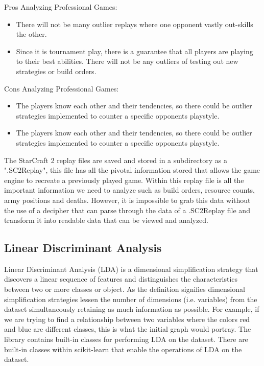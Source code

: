 \documentclass[a4paper,12pt]{report}
\begin{document}
Pros Analyzing Professional Games:
\vspace*{-.8cm}
\begin{itemize}[,]
    \setlength\itemsep{-.1cm}
    \item There will not be many outlier replays where one opponent vastly out-skills the other.
    \item Since it is tournament play, there is a guarantee that all players are playing to their best abilities. There will not be any outliers of testing out new strategies or build orders.
\end{itemize}

Cons Analyzing Professional Games:
\vspace*{-.775cm}
\begin{itemize}[,]
    \setlength\itemsep{-.1cm}
    \item The players know each other and their tendencies, so there could be outlier strategies implemented to counter a specific opponents playstyle.
    \item The players know each other and their tendencies, so there could be outlier strategies implemented to counter a specific opponents playstyle.
\end{itemize}

The StarCraft 2 replay files are saved and stored in a subdirectory as a ".SC2Replay", this file has all the pivotal information stored that allows the game engine to recreate a previously played game. Within this replay file is all the important information we need to analyze such as build orders, resource counts, army positions and deaths. However, it is impossible to grab this data without the use of a decipher that can parse through the data of a .SC2Replay file and transform it into readable data that can be viewed and analyzed.

\subsection{Linear Discriminant Analysis}
 
Linear Discriminant Analysis (LDA) is a dimensional simplification strategy that discovers a linear sequence of features and distinguishes the characteristics between two or more classes or object. As the definition signifies dimensional simplification strategies lessen the number of dimensions (i.e. variables) from the dataset simultaneously retaining as much information as possible. For example, if we are trying to find a relationship between two variables where the colors red and blue are different classes, this is what the initial graph would portray. The library contains built-in classes for performing LDA on the dataset. There are built-in classes within scikit-learn that enable the operations of LDA on the dataset.
\end{document}
